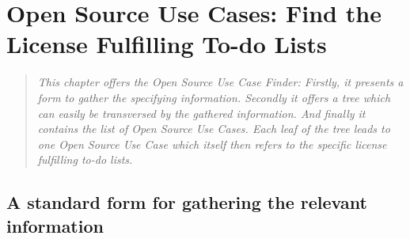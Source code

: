 %
%
%
%
%



\chapter{Open Source Use Cases: Find the License Fulfilling To-do Lists}\label{sec:OSUCfinder}

\footnotesize
\begin{quote}\itshape
This chapter offers the \emph{Open Source Use Case Finder}: Firstly, it presents
a form to gather the specifying information. Secondly it offers a tree which
can easily be transversed by the gathered information. And finally it contains
the list of \emph{Open Source Use Cases}. Each leaf of the tree leads to one
\emph{Open Source Use Case} which itself then refers to the specific license
fulfilling to-do lists.
\end{quote}
\normalsize{}

\section{A standard form for gathering the relevant information}
\label{OSLiCStandardFormForGatheringInformation}
 
